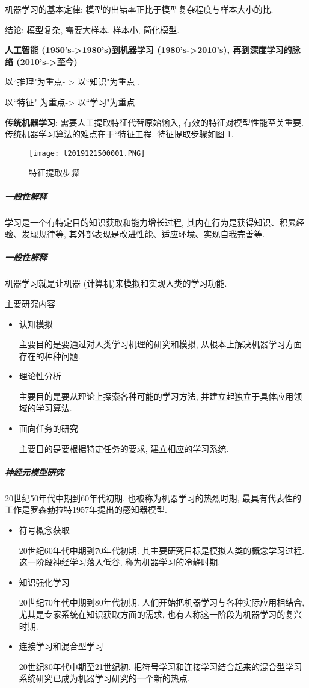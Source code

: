 机器学习的基本定律: 模型的出错率正比于模型复杂程度与样本大小的比.

结论:  模型复杂, 需要大样本. 样本小, 简化模型.

\textbf{人工智能 (1950's->1980's)到机器学习 (1980's->2010's), 再到深度学习的脉络 (2010's->至今)}
\begin{center}
以“推理"为重点- > 以“知识"为重点 .

以“特征" 为重点-> 以“学习"为重点.
\end{center}

\textbf{传统机器学习}:  需要人工提取特征代替原始输入, 有效的特征对模型性能至关重要. 传统机器学习算法的难点在于“特征工程. 特征提取步骤如图 \ref{AI32fig2019121501}.
\begin{figure}[H]
\centering
\texttt{[image: t2019121500001.PNG]}
\caption{特征提取步骤}
\label{AI32fig2019121501}
\end{figure}
\subparagraph{一般性解释}
学习是一个有特定目的知识获取和能力增长过程, 其内在行为是获得知识、积累经验、发现规律等, 其外部表现是改进性能、适应环境、实现自我完善等.
\subparagraph{一般性解释}
机器学习就是让机器 (计算机)来模拟和实现人类的学习功能.

主要研究内容
\begin{itemize}
\item 认知模拟

    主要目的是要通过对人类学习机理的研究和模拟, 从根本上解决机器学习方面存在的种种问题.
\item 理论性分析

     主要目的是要从理论上探索各种可能的学习方法, 并建立起独立于具体应用领域的学习算法.
\item 面向任务的研究

    主要目的是要根据特定任务的要求, 建立相应的学习系统.
\end{itemize}
\subparagraph{神经元模型研究}
 20世纪50年代中期到60年代初期, 也被称为机器学习的热烈时期, 最具有代表性的工作是罗森勃拉特1957年提出的感知器模型.
\begin{itemize}
\item 符号概念获取

    20世纪60年代中期到70年代初期. 其主要研究目标是模拟人类的概念学习过程. 这一阶段神经学习落入低谷, 称为机器学习的冷静时期.
\item 知识强化学习

    20世纪70年代中期到80年代初期. 人们开始把机器学习与各种实际应用相结合, 尤其是专家系统在知识获取方面的需求, 也有人称这一阶段为机器学习的复兴时期.
\item 连接学习和混合型学习

    20世纪80年代中期至21世纪初. 把符号学习和连接学习结合起来的混合型学习系统研究已成为机器学习研究的一个新的热点.
\end{itemize}

